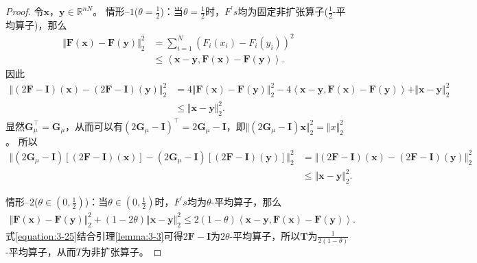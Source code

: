 \begin{proof}令$\mathbf{x}$，$\mathbf{y}\in\mathbb{R}^{nN}$。
	情形--$1$($\theta=\frac{1}{2}$)：当$\theta=\frac{1}{2}$时，$F^\prime{s}$均为固定非扩张算子($\frac{1}{2}$-平均算子)，那么
	\begin{equation}
		\begin{aligned}
			\Vert{\mathbf{F}(\mathbf{x})-\mathbf{F}(\mathbf{y})}\Vert_2^2
			&=\sum_{i=1}^{N}\left(F_i(x_i)-F_i(y_i)\right)^2 \\
			&\leq\left\langle{\mathbf{x}-\mathbf{y},\mathbf{F}(\mathbf{x})-\mathbf{F}(\mathbf{y})}\right\rangle.
		\end{aligned} 
	\end{equation}
	因此
	\begin{equation}
		\begin{aligned}
			\Vert{(2\mathbf{F}-\mathbf{I})(\mathbf{x})-(2\mathbf{F}-\mathbf{I})(\mathbf{y})}\Vert_2^2 &=4\Vert{\mathbf{F}(\mathbf{x})-\mathbf{F}(\mathbf{y})}\Vert_2^2-4\left\langle{\mathbf{x}-\mathbf{y},\mathbf{F}(\mathbf{x})-\mathbf{F}(\mathbf{y})}\right\rangle+\Vert{\mathbf{x}-\mathbf{y}}\Vert_2^2\\
			&\leq\Vert{\mathbf{x}-\mathbf{y}}\Vert_2^2.
		\end{aligned} 
	\end{equation}
	显然$\mathbf{G}_{\mu}^\top=\mathbf{G}_{\mu}$，从而可以有$(2\mathbf{G}_{\mu}-\mathbf{I})^\top=2\mathbf{G}_{\mu}-\mathbf{I}$，即$\Vert{(2\mathbf{G}_{\mu}-\mathbf{I})\mathbf{x}}\Vert_2^2=\Vert{x}\Vert_2^2$。
	所以
	\begin{equation}
		\begin{aligned}
			\Vert{(2\mathbf{G}_{\mu}-\mathbf{I})[(2\mathbf{F}-\mathbf{I})(\mathbf{x})]-(2\mathbf{G}_{\mu}-\mathbf{I})[(2\mathbf{F}-\mathbf{I})(\mathbf{y})]}\Vert_2^2 
			&=\Vert{(2\mathbf{F}-\mathbf{I})(\mathbf{x})-(2\mathbf{F}-\mathbf{I})(\mathbf{y})}\Vert_2^2\\
			&\leq\Vert{\mathbf{x}-\mathbf{y}}\Vert_2^2.
		\end{aligned}
	\end{equation}
	
	情形--$2$($\theta\in(0,\frac{1}{2})$)：当$\theta\in(0,\frac{1}{2})$时，$F^\prime{s}$均为$\theta$-平均算子，那么
	\begin{equation} \label{equation:3-25}
		\begin{aligned}
			\Vert{\mathbf{F}(\mathbf{x})-\mathbf{F}(\mathbf{y})}\Vert_2^2+(1-2\theta)\Vert{\mathbf{x}-\mathbf{y}}\Vert_2^2\leq{2(1-\theta)}\left\langle{\mathbf{x}-\mathbf{y},\mathbf{F}(\mathbf{x})-\mathbf{F}(\mathbf{y})}\right\rangle .
		\end{aligned} 
	\end{equation}
	式\eqref{equation:3-25}结合引理\ref{lemma:3-3}可得$2\mathbf{F}-\mathbf{I}$为$2\theta$-平均算子，所以$\mathbf{T}$为$\frac{1}{2(1-\theta)}$-平均算子，从而$T$为非扩张算子。
\end{proof}

